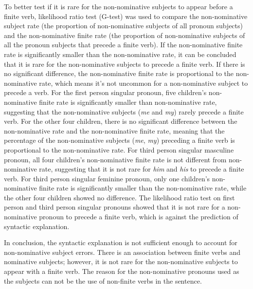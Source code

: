 To better test if it is rare for the  non-nominative subjects to appear before a finite verb, likelihood ratio test (G-test) was used to compare the non-nominative subject rate (the proportion of non-nominative subjects of all pronoun subjects) and the non-nominative finite rate (the proportion of non-nominative subjects of all the pronoun subjects that precede a finite verb). If the non-nominative finite rate is significantly smaller than the non-nominative rate, it can be concluded that it is rare for the non-nominative subjects to precede a finite verb. If there is no significant difference, the non-nominative finite rate is proportional to the non-nominative rate, which means it's not uncommon for a non-nominative subject to precede a verb. For the first person singular pronoun, five children's non-nominative finite rate is significantly smaller than non-nominative rate, suggesting that the non-nominative subjects (\textit{me} and \textit{my}) rarely precede a finite verb. For the other four children, there is no significant difference between the non-nominative rate and the non-nominative finite rate, meaning that the percentage of the non-nominative subjects (\textit{me}, \textit{my}) preceding a finite verb is proportional to the non-nominative rate. For third person singular masculine pronoun, all four children's non-nominative finite rate is not different from non-nominative rate, suggesting that it is not rare for \textit{him} and \textit{his} to precede a finite verb. For third person singular feminine pronoun, only one children's non-nominative finite rate is significantly smaller than the non-nominative rate, while the other four children showed no difference. The likelihood ratio test on first person and third person singular pronouns showed that it is not rare for a non-nominative pronoun to precede a finite verb, which is against the prediction of syntactic explanation.


In conclusion, the syntactic explanation is not sufficient enough to account for non-nominative subject errors. There is an association between finite verbs and nominative subjects; however, it is not rare for the non-nominative subjects to appear with a finite verb. The reason for the non-nominative pronouns used as the subjects can not be the use of non-finite verbs in the sentence.
